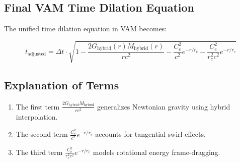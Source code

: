 \documentclass[12pt]{article}
\begin{document}
\subsection{Final VAM Time Dilation Equation}
The unified time dilation equation in VAM becomes:

\begin{equation}
\boxed{
t_\text{adjusted} = \Delta t \cdot \sqrt{
1
- \frac{2 G_{\text{hybrid}}(r) M_{\text{hybrid}}(r)}{r c^2}
- \frac{C_e^2}{c^2} e^{-r/r_c}
- \frac{C_e^2}{r_c^2 c^2} e^{-r/r_c}
}
}
\label{eq:final_vam_td}
\end{equation}

\subsection{Explanation of Terms}
\begin{enumerate}
    \item The first term \(\frac{2 G_{\text{hybrid}} M_{\text{hybrid}}}{r c^2}\) generalizes Newtonian gravity using hybrid interpolation.
    \item The second term \(\frac{C_e^2}{c^2} e^{-r/r_c}\) accounts for tangential swirl effects.
    \item The third term \(\frac{C_e^2}{r_c^2 c^2} e^{-r/r_c}\) models rotational energy frame-dragging.
\end{enumerate}
\end{document}
